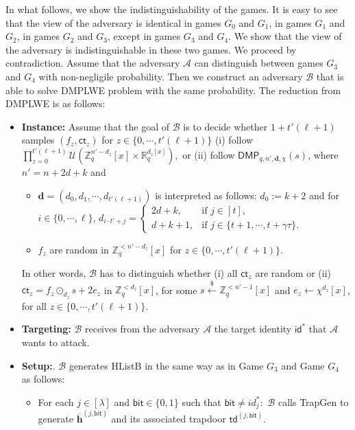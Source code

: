 \documentclass[runningheads]{llncs}
\begin{document}
In what follows, we show the indistinguishability of the games.
It is easy to see that the view of the adversary is identical in games $G_0$ and $G_1$, 
in games $G_1$ and $G_2$, in games $G_2$ and $G_3$, except in games $G_3$ and $G_4$. 
We show that the view of the adversary is indistinguishable in these two games. 
We proceed by contradiction.
Assume that the adversary $\mathcal{A}$ can distinguish between games $G_3$ and $G_4$ 
with non-negligile probability. 
Then we construct an adversary $\mathcal{B}$ that is able to solve \textsf{DMPLWE} problem with the same probability. The reduction from \textsf{DMPLWE} is as follows:
\begin{itemize}
\item \textbf{Instance:} Assume that the goal of $\mathcal{B}$ is to decide whether $1+t'(\ell+1)$ samples $ (f_{z},\textsf{ct}_{z})$ for $z \in \{0, \cdots, t'(\ell+1)\}$  (i) follow $ \prod_{z=0}^{t'(\ell+1)} \mathcal{U}(\mathbb{Z}_q^{n'-d_{z}}[x] \times \mathbb{R}_q^{d_{z}[x]} ),$ or (ii) follow $ \mathsf{DMP}_{q,n',\textbf{d}, \chi}(s)$, where $n'=n+2d+k$ and 
\begin{itemize}
\item 
$\textbf{d}=(d_0, d_1,\cdots, d_{t'(\ell+1)})$ is interpreted as follows: $d_0:=k+2$ and for $i\in \{0, \cdots, \ell\}$,
 $d_{i\cdot t'+j} = \begin{cases} 
 2d+k, & \mbox{if } j \in [t] ,\\ 
 d+k+1, & \mbox{if } j \in \{t+1, \cdots, t+\gamma \tau \}. 
  \end{cases}$
 

\item  $f_z$ are random in $\mathbb{Z}_q^{<n'-d_z}[x]$ for $z\in \{0, \cdots, t'(\ell+1)\}$.

\end{itemize}
In other words, $\mathcal{B}$ has to distinguish whether (i) all $\textsf{ct}_{z}$ are random or (ii) $\textsf{ct}_z=f_z\odot_{d_z}s+2e_z$ in $\mathbb{Z}_q^{<d_z}[x]$, for some $s \xleftarrow[]{\$}\mathbb{Z}_q^{<n'-1}[x]$ and 
 $e_{z} \leftarrow \chi^{d_{z}}[x]$, for all $z\in \{0, \cdots, t'(\ell+1)\}$.

\item \textbf{Targeting:} $\mathcal{B}$ receives from the adversary $\mathcal{A}$ the target identity $\textsf{id}^*$ that $\mathcal{A}$ wants to attack.
\item \textbf{Setup:}. $\mathcal{B}$ generates \textsf{HListB} in the same way as in Game $G_3$ and Game $G_4$ as follows:
\begin{itemize}
\item For each $j \in [\lambda]$ and $\textsf{bit}\in\{0,1\}$ such that $\textsf{bit} \neq  id^*_j:$ $\mathcal{B}$ calls \textsf{TrapGen} to generate  $ \overline{\textbf{h}}^{(j,\mathsf{bit})}$ and its associated trapdoor $\textsf{td}^{(j,\textsf{bit})}$.  


\end{itemize}
\end{itemize}
\end{document}
